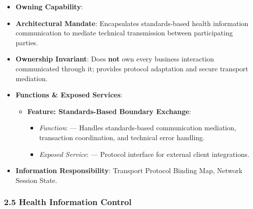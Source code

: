\begin{itemize}

\item
\textbf{Owning Capability}: \texttt{}



\item
\textbf{Architectural Mandate}: Encapsulates standards-based health information communication to mediate technical transmission between participating parties.



\item
\textbf{Ownership Invariant}: Does \textbf{not} own every business interaction communicated through it; provides protocol adaptation and secure transport mediation.



\item
\textbf{Functions \& Exposed Services}:


\begin{itemize}

\item
\textbf{Feature: Standards-Based Boundary Exchange}:


\begin{itemize}

\item
\emph{Function}: \texttt{} — Handles standards-based communication mediation, transaction coordination, and technical error handling.



\item
\emph{Exposed Service}: \texttt{} — Protocol interface for external client integrations.



\end{itemize}


\end{itemize}


\item
\textbf{Information Responsibility}: Transport Protocol Binding Map, Network Session State.



\end{itemize}
\label{rad:ise:101}

\par\smallskip
{}\label{rad:ise:103}
\subsubsection*{2.5 Health Information Control}
\label{rad:ise:104}

